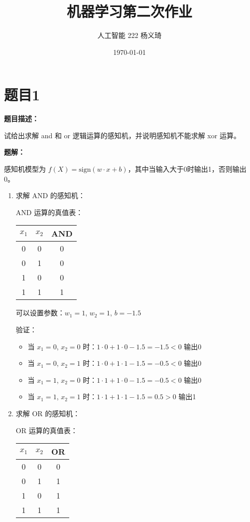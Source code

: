 \documentclass[UTF8]{ctexart}
\begin{document}
	
	\title{机器学习第二次作业}
	\author{人工智能 222 杨义琦}
	\date{\today}
	\maketitle
	
	\section{题目1}
	\textbf{题目描述：}
	
	试给出求解 and 和 or 逻辑运算的感知机，并说明感知机不能求解 xor 运算。
	
	\textbf{题解：}
	
	感知机模型为 $f(X)=\text{sign}(w \cdot x + b)$，其中当输入大于0时输出1，否则输出0。
	
	\begin{enumerate}
		\item 求解 AND 的感知机：
		
		AND 运算的真值表：
		\begin{center}
			\begin{tabular}{|c|c|c|}
				\hline
				$x_1$ & $x_2$ & AND \\
				\hline
				0 & 0 & 0 \\
				0 & 1 & 0 \\
				1 & 0 & 0 \\
				1 & 1 & 1 \\
				\hline
			\end{tabular}
		\end{center}
		
		可以设置参数：$w_1 = 1$, $w_2 = 1$, $b = -1.5$
		
		验证：
		\begin{itemize}
			\item 当 $x_1=0$, $x_2=0$ 时：$1\cdot0 + 1\cdot0 - 1.5 = -1.5 < 0$ 输出0
			\item 当 $x_1=0$, $x_2=1$ 时：$1\cdot0 + 1\cdot1 - 1.5 = -0.5 < 0$ 输出0
			\item 当 $x_1=1$, $x_2=0$ 时：$1\cdot1 + 1\cdot0 - 1.5 = -0.5 < 0$ 输出0
			\item 当 $x_1=1$, $x_2=1$ 时：$1\cdot1 + 1\cdot1 - 1.5 = 0.5 > 0$ 输出1
		\end{itemize}
		
		\item 求解 OR 的感知机：
		
		OR 运算的真值表：
		\begin{center}
			\begin{tabular}{|c|c|c|}
				\hline
				$x_1$ & $x_2$ & OR \\
				\hline
				0 & 0 & 0 \\
				0 & 1 & 1 \\
				1 & 0 & 1 \\
				1 & 1 & 1 \\
				\hline
			\end{tabular}
		\end{center}
		

\end{enumerate}
\end{document}
